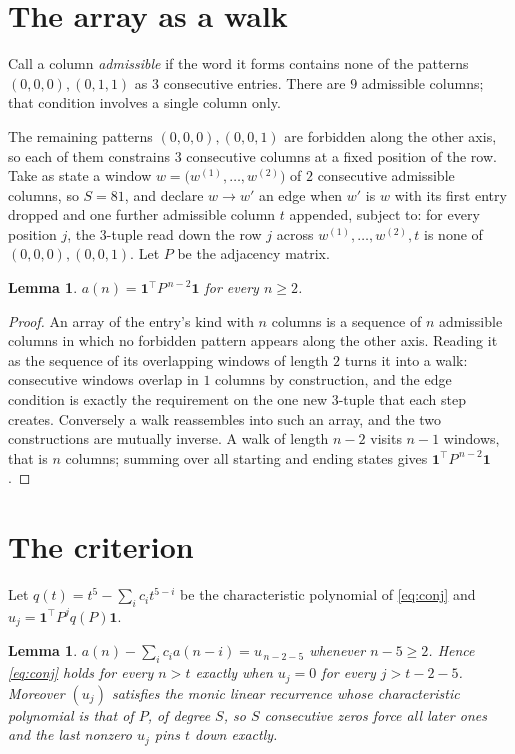 \documentclass[11pt,a4paper]{article}
\theoremstyle{plain}
\newtheorem{lemma}[theorem]{Lemma}
\theoremstyle{definition}
\begin{document}
\section{The array as a walk}

Call a column \emph{admissible} if the word it forms contains none of the patterns
$(0,0,0), (0,1,1)$ as $3$ consecutive entries. There are $9$ admissible columns; that condition
involves a single column only.

The remaining patterns $(0,0,0), (0,0,1)$ are forbidden along the other axis, so each of them
constrains $3$ consecutive columns at a fixed position of the row. Take as state a
window $w=\bigl(w^{(1)},\dots,w^{(2)}\bigr)$ of $2$ consecutive admissible
columns, so $S=81$, and declare $w\to w'$ an edge when $w'$ is $w$ with its first entry
dropped and one further admissible column $t$ appended, subject to: for every position
$j$, the $3$-tuple read down the row $j$ across $w^{(1)},\dots,w^{(2)},t$
is none of $(0,0,0), (0,0,1)$. Let $P$ be the adjacency matrix.

\begin{lemma}\label{lem:walk}
$a(n)=\mathbf{1}^{\!\top}P^{\,n-2}\mathbf{1}$ for every $n\ge2$.
\end{lemma}

\begin{proof}
An array of the entry's kind with $n$ columns is a sequence of $n$ admissible columns in
which no forbidden pattern appears along the other axis. Reading it as the sequence of its
overlapping windows of length $2$ turns it into a walk: consecutive windows overlap in
$1$ columns by construction, and the edge condition is exactly the requirement on the one
new $3$-tuple that each step creates. Conversely a walk reassembles into such an array,
and the two constructions are mutually inverse. A walk of length $n-2$ visits $n-1$
windows, that is $n$ columns; summing over all starting and ending states gives
$\mathbf{1}^{\!\top}P^{\,n-2}\mathbf{1}$.
\end{proof}

\section{The criterion}

Let $q(t)=t^{5}-\sum_i c_i t^{5-i}$ be the characteristic polynomial of
\eqref{eq:conj} and $u_j=\mathbf{1}^{\!\top}P^{j}q(P)\mathbf{1}$.

\begin{lemma}\label{lem:crit}
$a(n)-\sum_i c_i a(n-i)=u_{\,n-2-5}$ whenever $n-5\ge2$. Hence
\eqref{eq:conj} holds for every $n>t$ exactly when $u_j=0$ for every
$j>t-2-5$. Moreover $(u_j)$ satisfies the monic linear recurrence whose
characteristic polynomial is that of $P$, of degree $S$, so $S$ consecutive zeros force all
later ones and the last nonzero $u_j$ pins $t$ down exactly.
\end{lemma}
\end{document}
